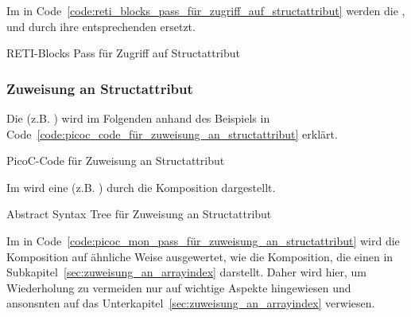 Im  in Code~\ref{code:reti_blocks_pass_für_zugriff_auf_structattribut} werden die  ,  und  durch ihre entsprechenden  ersetzt.

\begin{code}
  \centering
  \caption{RETI-Blocks Pass für Zugriff auf Structattribut}
  \label{code:reti_blocks_pass_für_zugriff_auf_structattribut}
\end{code}

\subsubsection{Zuweisung an Structattribut}
Die  (z.B. ) wird im Folgenden anhand des Beispiels in Code~\ref{code:picoc_code_für_zuweisung_an_structattribut} erklärt.

\begin{code}
  \centering
  \caption{PicoC-Code für Zuweisung an Structattribut}
  \label{code:picoc_code_für_zuweisung_an_structattribut}
\end{code}

Im  wird eine   (z.B. ) durch die Komposition  dargestellt.

\begin{code}
  \centering
  \caption{Abstract Syntax Tree für Zuweisung an Structattribut}
  \label{code:abstract_syntax_tree_für_zuweisung_an_structattribut}
\end{code}

Im  in Code~\ref{code:picoc_mon_pass_für_zuweisung_an_structattribut} wird die Komposition  auf ähnliche Weise ausgewertet, wie die Komposition, die einen   in Subkapitel~\ref{sec:zuweisung_an_arrayindex} darstellt. Daher wird hier, um Wiederholung zu vermeiden nur auf wichtige Aspekte hingewiesen und ansonsnten auf das Unterkapitel~\ref{sec:zuweisung_an_arrayindex} verwiesen.

